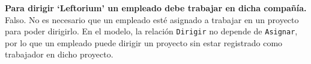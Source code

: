 \textbf{Para dirigir ‘Leftorium’ un empleado debe trabajar en dicha compañía.}\vspace{.3cm}
Falso. No es necesario que un empleado esté asignado a trabajar en un proyecto para poder dirigirlo. En el modelo, la relación \texttt{Dirigir} no depende de \texttt{Asignar}, por lo que un empleado puede dirigir un proyecto sin estar registrado como trabajador en dicho proyecto.
